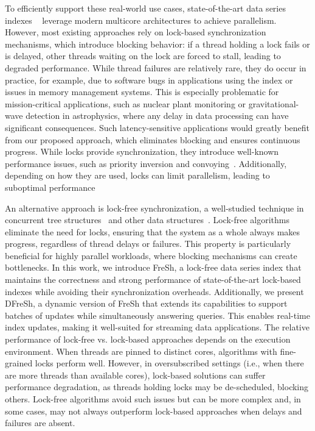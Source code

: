 %
To efficiently support these real-world use cases, state-of-the-art data series indexes
~\cite{DBLP:journals/pvldb/EchihabiZPB18,isaxfamily,peng2018paris,peng2020messi,PFP21-I,PFP21-II,hercules} 
leverage modern multicore architectures to achieve parallelism. However, most existing 
approaches rely on lock-based synchronization mechanisms, which introduce blocking behavior:
if a thread holding a lock fails or is delayed, other threads waiting on the lock are forced to stall,
leading to degraded performance.
While thread failures are relatively rare, they do occur in practice, for example, due to 
software bugs in applications using the index or issues in memory management systems. 
This is especially problematic for mission-critical applications, such as nuclear plant 
monitoring or gravitational-wave detection in astrophysics, where any delay in data processing 
can have significant consequences. Such latency-sensitive applications would greatly benefit
from our proposed approach, which eliminates blocking and ensures continuous progress.
%
While locks provide synchronization, they introduce well-known performance issues, 
such as priority inversion and convoying~\cite{F04}. Additionally, depending on how they
are used, locks can limit parallelism, leading to suboptimal performance

An alternative approach is lock-free synchronization, a well-studied technique in concurrent 
tree structures~\cite{EFRB10,EFHR14,FR2018,ABF+22} and other data structures~\cite{F04,HS08,FKR18}. 
Lock-free algorithms eliminate the need for locks, ensuring that the system as a whole 
always makes progress, regardless of thread delays or failures. This property is particularly 
beneficial for highly parallel workloads, where blocking mechanisms can create bottlenecks. 
%
In this work, we introduce FreSh, a lock-free data series index that maintains the 
correctness and strong performance of state-of-the-art lock-based indexes while avoiding 
their synchronization overheads. Additionally, we present DFreSh, a dynamic version of 
FreSh that extends its capabilities to support batches of updates while simultaneously 
answering queries. This enables real-time index updates, making it well-suited for streaming
data applications.
%
The relative performance of lock-free vs. lock-based approaches depends on the execution environment.
When threads are pinned to distinct cores, algorithms with fine-grained locks perform well. 
However, in oversubscribed settings (i.e., when there are more threads than available cores),
lock-based solutions can suffer performance degradation, as threads holding locks may be
de-scheduled, blocking others. Lock-free algorithms avoid such issues but can be more complex and,
in some cases, may not always outperform lock-based approaches when delays and failures are absent.

